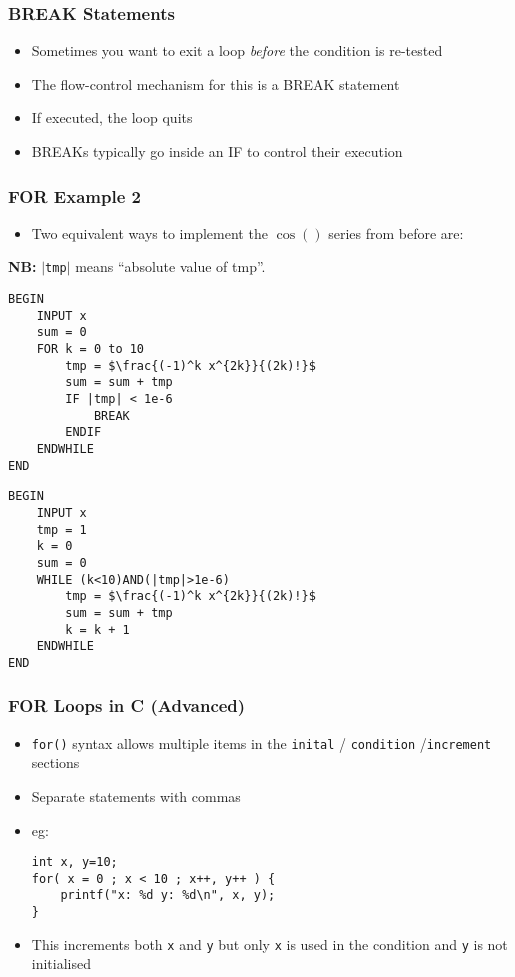 \documentclass[14pt]{beamer}
\begin{document}
\begin{frame}
\frametitle{BREAK Statements}
\begin{itemize}
\item Sometimes you want to exit a loop \textit{before} the condition is re-tested
\item The flow-control mechanism for this is a BREAK statement
\item If executed, the loop quits
\item BREAKs typically go inside an IF to control their execution
\end{itemize}
\end{frame}

\begin{frame}[fragile]
\frametitle{FOR Example 2}
\begin{itemize}
\item Two equivalent ways to implement the $\cos()$ series from before are:
\end{itemize}
{\small\textbf{NB:} $|$\texttt{tmp}$|$ means ``absolute value of tmp''.}
\begin{multicols}{2}
\begin{lstlisting}[style=pseudo,mathescape=true,basicstyle=\ttfamily\scriptsize]
BEGIN
	INPUT x
	sum = 0
	FOR k = 0 to 10
		tmp = $\frac{(-1)^k x^{2k}}{(2k)!}$
		sum = sum + tmp
		IF |tmp| < 1e-6
			BREAK
		ENDIF
	ENDWHILE 
END
\end{lstlisting}
\columnbreak
\begin{lstlisting}[style=pseudo,mathescape=true,basicstyle=\ttfamily\scriptsize]
BEGIN
	INPUT x
	tmp = 1
	k = 0
	sum = 0
	WHILE (k<10)AND(|tmp|>1e-6)
		tmp = $\frac{(-1)^k x^{2k}}{(2k)!}$
		sum = sum + tmp
		k = k + 1
	ENDWHILE 
END
\end{lstlisting}

\end{multicols}
\end{frame}



\begin{frame}[fragile]
\frametitle{FOR Loops in C (Advanced)}
\begin{itemize}
\item \texttt{for()} syntax allows multiple items in the \texttt{inital} / \texttt{condition} /\texttt{increment} sections
\item Separate statements with commas
\item eg:
\begin{lstlisting}[style=CStyle]
int x, y=10;
for( x = 0 ; x < 10 ; x++, y++ ) {
	printf("x: %d y: %d\n", x, y);
}
\end{lstlisting}
\item This increments both \texttt{x} and \texttt{y} but only \texttt{x} is used in the condition and \texttt{y} is not initialised
\end{itemize}
\end{frame}
\end{document}
